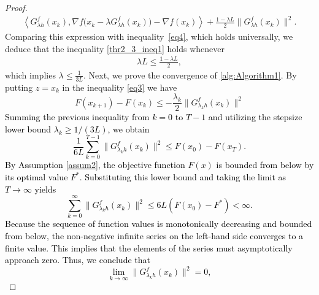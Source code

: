 \documentclass[11pt, a4paper, oneside, reqno]{amsart}
\begin{document}
\begin{proof}
{\begin{align}
    \left\langle G^{f}_{\lambda h}(x_k),
    \nabla f\bigl(x_k - \lambda G^{f}_{\lambda h}(x_k)\bigr) - \nabla f(x_k)
    \right\rangle
    + \frac{1 - \lambda L}{2}\|G^{f}_{\lambda h}(x_k)\|^2.
\end{align}
Comparing this expression with inequality~\eqref{eq4}, which holds universally, we deduce that the inequality \eqref{thr2_3_ineq1} holds whenever
\begin{align}\label{thr2_3_ineq2}
    \lambda L \leq \frac{1 - \lambda L}{2},
\end{align}
which implies $\lambda \leq \frac{1}{3L}$.}
Next, we prove the convergence of \ref{alg:Algorithm1}. By putting $z = x_k$ in the inequality \ref{eq3} we have
\begin{equation}\label{conv-analysis}
F(x_{k+1}) - F(x_k) \leq - \dfrac{\lambda_k}{2} \|G^{f}_{\lambda_k h}(x_k)\|^2  
\end{equation}
\textcolor{black}{Summing the previous inequality from $k=0$ to $T-1$ and utilizing the stepsize lower bound $\lambda_k \geq 1/(3L)$, we obtain
\begin{equation*}
\frac{1}{6L}\sum_{k=0}^{T-1} \|G^{f}_{\lambda_k h}(x_k)\|^2 \leq F(x_0) - F(x_{T}).
\end{equation*}
By Assumption \ref{assum2}, the objective function $F(x)$ is bounded from below by its optimal value $F^*$. Substituting this lower bound and taking the limit as $T \to \infty$ yields
\begin{equation*}
\sum_{k=0}^\infty \|G^{f}_{\lambda_k h}(x_k)\|^2 \leq 6L (F(x_0) - F^*) < \infty.
\end{equation*}
Because the sequence of function values is monotonically decreasing and bounded from below, the non-negative infinite series on the left-hand side converges to a finite value. This implies that the elements of the series must asymptotically approach zero. Thus, we conclude that
\begin{equation*}
\lim_{k \to \infty} \|G^{f}_{\lambda_k h}(x_k)\|^2 = 0,

\end{equation*}}
\end{proof}
\end{document}
